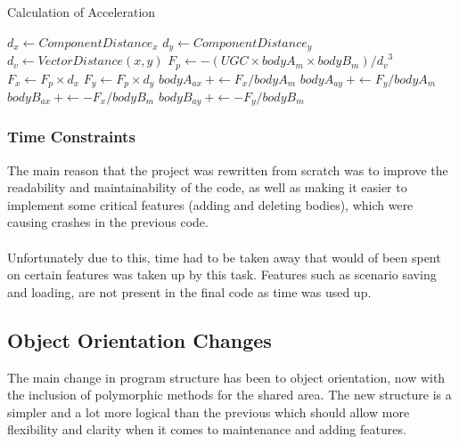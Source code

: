 {\setcounter{algorithm}{1}

\begin{algorithm}[H]
\caption{Calculation of Acceleration}
\begin{algorithmic}[1]
    \STATE $d_x \leftarrow ComponentDistance_x$
    \STATE $d_y \leftarrow ComponentDistance_y$
    \STATE $d_v \leftarrow VectorDistance(x,y)$
    \STATE  
    \STATE $F_p \leftarrow -(UGC \times bodyA_m \times bodyB_m) / {d_v}^3$
    \STATE $F_x \leftarrow F_p \times d_x$
    \STATE $F_y \leftarrow F_p \times d_y$
    \STATE
    \STATE $bodyA_{ax}~+\leftarrow F_x/bodyA_m$
    \STATE $bodyA_{ay}~+\leftarrow F_y/bodyA_m$
    \STATE
    \STATE $bodyB_{ax}~+\leftarrow -F_x/bodyB_m$
    \STATE $bodyB_{ay}~+\leftarrow -F_y/bodyB_m$
  \ENDFOR
\ENDFOR
\end{algorithmic}
\end{algorithm}

\pagebreak

\subsubsection{Time Constraints}
The main reason that the project was rewritten from scratch was to improve the readability and maintainability of the code, as well as making it easier to implement some critical features (adding and deleting bodies), which were causing crashes in the previous code.

\paragraph{}
Unfortunately due to this, time had to be taken away that would of been spent on certain features was taken up by this task. Features such as scenario saving and loading, are not present in the final code as time was used up.

\subsection{Object Orientation Changes}
The main change in program structure has been to object orientation, now with the inclusion of polymorphic methods for the shared area. The new structure is a simpler and a lot more logical than the previous which should allow more flexibility and clarity when it comes to maintenance and adding features.

\pagebreak
}
